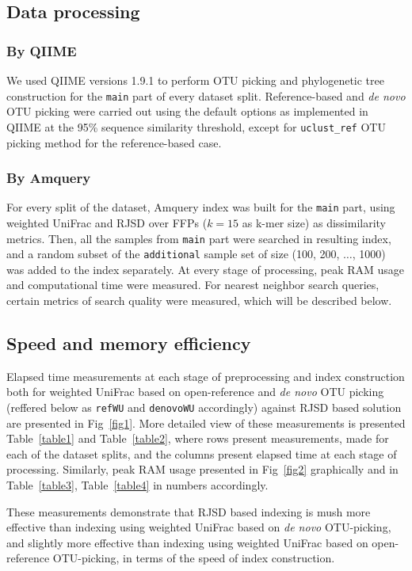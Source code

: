 \documentclass[10pt,letterpaper]{article}
\begin{document}
\subsection*{Data processing}

\subsubsection*{By QIIME}
We used QIIME versions 1.9.1 to perform OTU picking and phylogenetic tree construction for the \texttt{main} part of every dataset split.
Reference-based and \textit{de novo} OTU picking were carried out using the default options as implemented in QIIME at the 95\% sequence similarity threshold, 
except for \texttt{uclust\_ref} OTU picking method for the reference-based case.

\subsubsection*{By Amquery}
For every split of the dataset, Amquery index was built for the \texttt{main} part, using weighted UniFrac and RJSD over FFPs ($k=15$ as k-mer size) as dissimilarity metrics.
Then, all the samples from \texttt{main} part were searched in resulting index, and a random subset of the \texttt{additional} sample set of size (100, 200, $\dots$, 1000) was added to the index separately. 
At every stage of processing, peak RAM usage and computational time were measured. For nearest neighbor search queries, certain metrics of search quality were measured, which will be described below. 

\subsection*{Speed and memory efficiency}
Elapsed time measurements at each stage of preprocessing and index construction 
both for weighted UniFrac based on open-reference and \textit{de novo} OTU picking (reffered below as \texttt{refWU} and \texttt{denovoWU} accordingly) against RJSD based solution 
are presented in Fig~\ref{fig1}.
More detailed view of these measurements is presented Table~\ref{table1} and Table~\ref{table2},
where rows present measurements, made for each of the dataset splits, and the columns present elapsed time at each stage of processing. 
Similarly, peak RAM usage presented in Fig~\ref{fig2} graphically and in Table~\ref{table3}, Table~\ref{table4} in numbers accordingly.

These measurements demonstrate that RJSD based indexing is mush more effective than indexing using weighted UniFrac based on \textit{de novo} OTU-picking,
and slightly more effective than indexing using weighted UniFrac based on open-reference OTU-picking, in terms of the speed of index construction.
\end{document}
